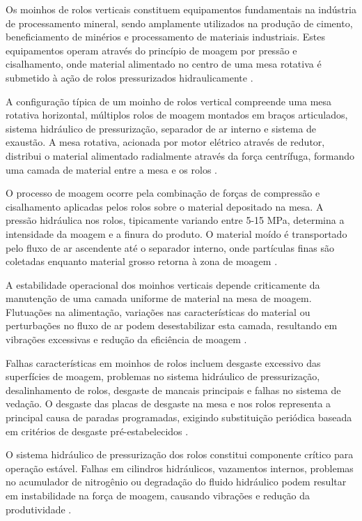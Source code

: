 Os moinhos de rolos verticais constituem equipamentos fundamentais na indústria de processamento mineral, sendo amplamente utilizados na produção de cimento, beneficiamento de minérios e processamento de materiais industriais. Estes equipamentos operam através do princípio de moagem por pressão e cisalhamento, onde material alimentado no centro de uma mesa rotativa é submetido à ação de rolos pressurizados hidraulicamente \cite{austin1984introduction}.

A configuração típica de um moinho de rolos vertical compreende uma mesa rotativa horizontal, múltiplos rolos de moagem montados em braços articulados, sistema hidráulico de pressurização, separador de ar interno e sistema de exaustão. A mesa rotativa, acionada por motor elétrico através de redutor, distribui o material alimentado radialmente através da força centrífuga, formando uma camada de material entre a mesa e os rolos \cite{duda1985cement}.

O processo de moagem ocorre pela combinação de forças de compressão e cisalhamento aplicadas pelos rolos sobre o material depositado na mesa. A pressão hidráulica nos rolos, tipicamente variando entre 5-15 MPa, determina a intensidade da moagem e a finura do produto. O material moído é transportado pelo fluxo de ar ascendente até o separador interno, onde partículas finas são coletadas enquanto material grosso retorna à zona de moagem \cite{locher2006cement}.

A estabilidade operacional dos moinhos verticais depende criticamente da manutenção de uma camada uniforme de material na mesa de moagem. Flutuações na alimentação, variações nas características do material ou perturbações no fluxo de ar podem desestabilizar esta camada, resultando em vibrações excessivas e redução da eficiência de moagem \cite{hesse2004process}.

Falhas características em moinhos de rolos incluem desgaste excessivo das superfícies de moagem, problemas no sistema hidráulico de pressurização, desalinhamento de rolos, desgaste de mancais principais e falhas no sistema de vedação. O desgaste das placas de desgaste na mesa e nos rolos representa a principal causa de paradas programadas, exigindo substituição periódica baseada em critérios de desgaste pré-estabelecidos \cite{tromans1989mill}.

O sistema hidráulico de pressurização dos rolos constitui componente crítico para operação estável. Falhas em cilindros hidráulicos, vazamentos internos, problemas no acumulador de nitrogênio ou degradação do fluido hidráulico podem resultar em instabilidade na força de moagem, causando vibrações e redução da produtividade \cite{gearless2010mills}.

